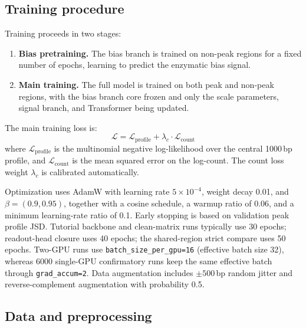 \documentclass[11pt,a4paper]{article}
\begin{document}
\subsection{Training procedure}
\label{sec:training}

Training proceeds in two stages:

\begin{enumerate}[leftmargin=2em]
  \item \textbf{Bias pretraining.} The bias branch is trained on
  non-peak regions for a fixed number of epochs, learning to predict
  the enzymatic bias signal.

  \item \textbf{Main training.} The full model is trained on both peak
  and non-peak regions, with the bias branch core frozen and only the
  scale parameters, signal branch, and Transformer being updated.
\end{enumerate}

\noindent The main training loss is:
\begin{equation}
  \mathcal{L} = \mathcal{L}_{\text{profile}} + \lambda_c \cdot \mathcal{L}_{\text{count}}
\end{equation}
where $\mathcal{L}_{\text{profile}}$ is the multinomial negative
log-likelihood over the central 1000\,bp profile, and
$\mathcal{L}_{\text{count}}$ is the mean squared error on the
log-count. The count loss weight $\lambda_c$ is calibrated
automatically.

Optimization uses AdamW with learning rate $5\times 10^{-4}$, weight
decay 0.01, and $\beta=(0.9, 0.95)$, together with a cosine schedule, a
warmup ratio of 0.06, and a minimum learning-rate ratio of 0.1. Early
stopping is based on validation peak profile JSD. Tutorial backbone and
clean-matrix runs typically use 30 epochs; readout-head closure uses 40
epochs; the shared-region strict compare uses 50 epochs. Two-GPU runs
use \texttt{batch\_size\_per\_gpu=16} (effective batch size 32), whereas 6000
single-GPU confirmatory runs keep the same effective batch through
\texttt{grad\_accum=2}. Data augmentation includes $\pm 500$\,bp random jitter
and reverse-complement augmentation with probability 0.5.

\subsection{Data and preprocessing}
\label{sec:data}
\end{document}
